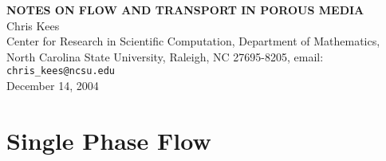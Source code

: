 \documentclass[10pt,dvips,twoside,reqno]{amsart}
\begin{document}
\begin{center}
{\bf NOTES ON FLOW AND TRANSPORT IN POROUS MEDIA \\}
Chris Kees\\
Center for Research in Scientific Computation, Department of Mathematics, North Carolina State University, Raleigh, NC 27695-8205, email: \texttt{chris\_kees@ncsu.edu} \\
December 14, 2004
\end{center}

\tableofcontents 

\section{Single Phase Flow}
\end{document}

